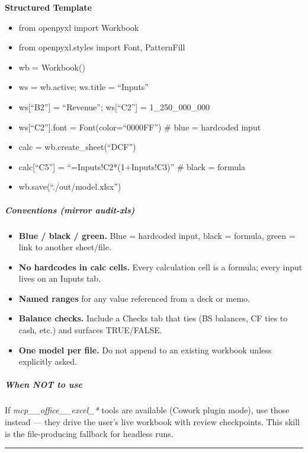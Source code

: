 \documentclass[11pt]{article}
\begin{document}
\textbf{Structured Template}
\begin{itemize}[leftmargin=*,itemsep=2pt,topsep=2pt]
\item {} from openpyxl import Workbook
\item {} from openpyxl.styles import Font, PatternFill
\item {} wb = Workbook()
\item {} ws = wb.active; ws.title = ``Inputs''
\item {} ws[``B2''] = ``Revenue''; ws[``C2''] = 1\_\allowbreak{}250\_\allowbreak{}000\_\allowbreak{}000
\item {} ws[``C2''].font = Font(color=``0000FF'') \# blue = hardcoded input
\item {} calc = wb.create\_\allowbreak{}sheet(``DCF'')
\item {} calc[``C5''] = ``=Inputs!C2*(1+Inputs!C3)'' \# black = formula
\item {} wb.save(``./out/model.xlsx'')
\end{itemize}

\subparagraph{Conventions (mirror \emph{audit-xls})}\mbox{}\par

\begin{itemize}[leftmargin=*,itemsep=2pt,topsep=2pt]
\item {} \textbf{Blue / black / green.} Blue = hardcoded input, black = formula, green = link to another sheet/file.
\item {} \textbf{No hardcodes in calc cells.} Every calculation cell is a formula; every input lives on an Inputs tab.
\item {} \textbf{Named ranges} for any value referenced from a deck or memo.
\item {} \textbf{Balance checks.} Include a Checks tab that ties (BS balances, CF ties to cash, etc.) and surfaces TRUE/FALSE.
\item {} \textbf{One model per file.} Do not append to an existing workbook unless explicitly asked.
\end{itemize}

\subparagraph{When NOT to use}\mbox{}\par

If \emph{mcp\_\allowbreak{}\_\allowbreak{}office\_\allowbreak{}\_\allowbreak{}excel\_\allowbreak{}*} tools are available (Cowork plugin mode), use those instead — they drive the user's live workbook with review checkpoints. This skill is the file-producing fallback for headless runs.


\vspace{0.8em}\hrule\vspace{0.8em}
\end{document}
